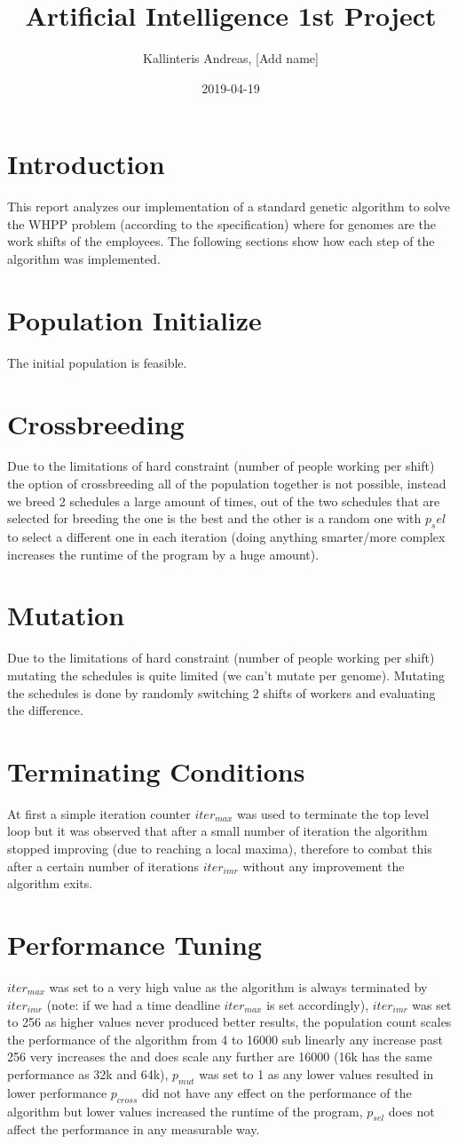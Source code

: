\documentclass{article}
\title{Artificial Intelligence 1st Project}
\date{2019-04-19}
\author{Kallinteris Andreas, [Add name]}
\begin{document}
\maketitle
\section*{Introduction}
This report analyzes our implementation of a standard genetic algorithm to solve the WHPP problem (according to the specification) where for genomes are the work shifts of the employees.
The following sections show how each step of the algorithm was implemented.
\section*{Population Initialize}
The initial population is feasible.
\section*{Crossbreeding}
Due to the limitations of hard constraint (number of people working per shift) the option of crossbreeding all of the population together is not possible,
instead we breed 2 schedules a large amount of times,
out of the two schedules that are selected for breeding the one is the best and the other is a random one with $p_sel$ to select a different one in each iteration (doing anything smarter/more complex increases the runtime of the program by a huge amount).
\section*{Mutation}
Due to the limitations of hard constraint (number of people working per shift) mutating the schedules is quite limited (we can't mutate per genome).
Mutating the schedules is done by randomly switching 2 shifts of workers and evaluating the difference.
\section*{Terminating Conditions}
At first a simple iteration counter $iter_{max}$ was used to terminate the top level loop but it was observed that after a small number of iteration the algorithm stopped improving (due to reaching a local maxima),
therefore to combat this after a certain number of iterations $iter_{imr}$ without any improvement the algorithm exits.
\section*{Performance Tuning}
$iter_{max}$ was set to a very high value as the algorithm is always terminated by $iter_{imr}$ (note: if we had a time deadline $iter_{max}$ is set accordingly),
$iter_{imr}$ was set to 256 as higher values never produced better results,
the population count scales the performance of the algorithm from 4 to 16000 sub linearly any increase past 256 very increases the and does scale any further are 16000 (16k has the same performance as 32k and 64k),
$p_{mut}$ was set to 1 as any lower values resulted in lower performance
$p_{cross}$ did not have any effect on the performance of the algorithm but lower values increased the runtime of the program,
$p_{sel}$ does not affect the performance in any measurable way.
\end{document}
